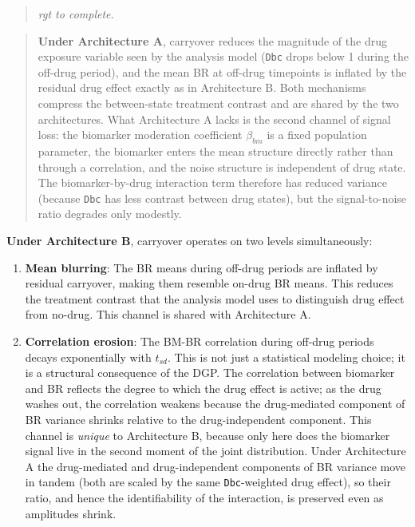 \documentclass[
  11pt,
]{article}
\newenvironment{rgt}{%
  \begin{quote}\small\itshape\color[RGB]{20,60,160}}{%
  \end{quote}}
\newenvironment{orig}{%
  \begin{quote}\normalsize\color[gray]{0.55}}{%
  \end{quote}}
\begin{document}
\begin{rgt}
rgt to complete.

\end{rgt}

\begin{orig}
\textbf{Under Architecture A}, carryover reduces the magnitude of the
drug exposure variable seen by the analysis model (\texttt{Dbc} drops
below 1 during the off-drug period), and the mean BR at off-drug
timepoints is inflated by the residual drug effect exactly as in
Architecture B. Both mechanisms compress the between-state treatment
contrast and are shared by the two architectures. What Architecture A
lacks is the second channel of signal loss: the biomarker moderation
coefficient \(\beta_{bm}\) is a fixed population parameter, the
biomarker enters the mean structure directly rather than through a
correlation, and the noise structure is independent of drug state. The
biomarker-by-drug interaction term therefore has reduced variance
(because \texttt{Dbc} has less contrast between drug states), but the
signal-to-noise ratio degrades only modestly.

\end{orig}

\textbf{Under Architecture B}, carryover operates on two levels
simultaneously:

\begin{enumerate}
\item \textbf{Mean blurring}: The BR means during off-drug periods are
  inflated by residual carryover, making them resemble on-drug
  BR means. This reduces the treatment contrast that the analysis
  model uses to distinguish drug effect from no-drug. This channel
  is shared with Architecture A.

\item \textbf{Correlation erosion}: The BM-BR correlation during off-drug
  periods decays exponentially with $t_{sd}$. This is not just a
  statistical modeling choice; it is a structural consequence
  of the DGP. The correlation between biomarker and BR reflects
  the degree to which the drug effect is active; as the drug
  washes out, the correlation weakens because the drug-mediated
  component of BR variance shrinks relative to the
  drug-independent component. This channel is \emph{unique} to
  Architecture B, because only here does the biomarker signal
  live in the second moment of the joint distribution. Under
  Architecture A the drug-mediated and drug-independent
  components of BR variance move in tandem (both are scaled by
  the same \texttt{Dbc}-weighted drug effect), so their ratio,
  and hence the identifiability of the interaction, is preserved
  even as amplitudes shrink.
\end{enumerate}
\end{document}
